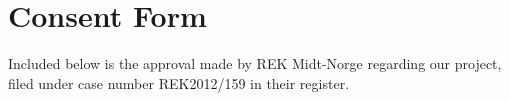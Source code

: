\chapter{Consent Form}
\label{app:consentform}

Included below is the approval made by REK Midt-Norge regarding our project, filed under case number REK2012/159 in their register.


\begin{centering}



\end{centering}